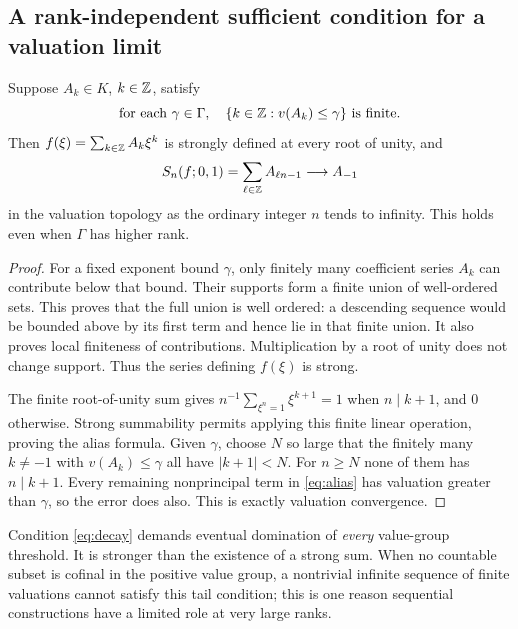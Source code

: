 \documentclass[11pt,letterpaper]{article}
\theoremstyle{definition}
\theoremstyle{remark}
\numberwithin{equation}{section}
\begin{document}
\subsection{A rank-independent sufficient condition for a valuation limit}
\begin{proposition}\label{prop:samplingcriterion}
Suppose $A_k\in K$, $k\in\mathbb Z$, satisfy
\begin{equation}\label{eq:decay}
 \text{for each }\gamma\in\Gamma,\quad
       \{k\in\mathbb Z:v(A_k)\le\gamma\}\text{ is finite}.
\end{equation}
Then $f(\xi)=\sum_{k\in\mathbb Z}A_k\xi^k$ is strongly defined at every root of unity, and
\begin{equation}\label{eq:alias}
 S_n(f;0,1)=\sum_{\ell\in\mathbb Z}A_{\ell n-1}
       \longrightarrow A_{-1}
\end{equation}
in the valuation topology as the ordinary integer $n$ tends to infinity. This holds even when $\Gamma$ has higher rank.
\end{proposition}
\begin{proof}
For a fixed exponent bound $\gamma$, only finitely many coefficient series $A_k$ can contribute below that bound. Their supports form a finite union of well-ordered sets. This proves that the full union is well ordered: a descending sequence would be bounded above by its first term and hence lie in that finite union. It also proves local finiteness of contributions. Multiplication by a root of unity does not change support. Thus the series defining $f(\xi)$ is strong.

The finite root-of-unity sum gives
$n^{-1}\sum_{\xi^n=1}\xi^{k+1}=1$ when $n\mid k+1$, and $0$ otherwise. Strong summability permits applying this finite linear operation, proving the alias formula. Given $\gamma$, choose $N$ so large that the finitely many $k\ne-1$ with $v(A_k)\le\gamma$ all have $|k+1|<N$. For $n\ge N$ none of them has $n\mid k+1$. Every remaining nonprincipal term in \eqref{eq:alias} has valuation greater than $\gamma$, so the error does also. This is exactly valuation convergence.
\end{proof}

Condition \eqref{eq:decay} demands eventual domination of \emph{every} value-group threshold. It is stronger than the existence of a strong sum. When no countable subset is cofinal in the positive value group, a nontrivial infinite sequence of finite valuations cannot satisfy this tail condition; this is one reason sequential constructions have a limited role at very large ranks.
\end{document}
